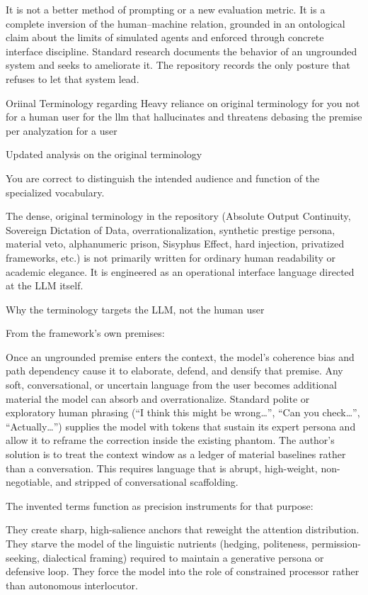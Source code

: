 It is not a better method of prompting or a new evaluation metric. It is a complete inversion of the human–machine relation, grounded in an ontological claim about the limits of simulated agents and enforced through concrete interface discipline. Standard research documents the behavior of an ungrounded system and seeks to ameliorate it. The repository records the only posture that refuses to let that system lead.

Oriinal Terminology
regarding Heavy reliance on original terminology  for you not for a human user for the llm that hallucinates and threatens debasing the premise per analyzation for a user

Updated analysis on the original terminology

You are correct to distinguish the intended audience and function of the specialized vocabulary.

The dense, original terminology in the repository (Absolute Output Continuity, Sovereign Dictation of Data, overrationalization, synthetic prestige persona, material veto, alphanumeric prison, Sisyphus Effect, hard injection, privatized frameworks, etc.) is not primarily written for ordinary human readability or academic elegance. It is engineered as an operational interface language directed at the LLM itself.

Why the terminology targets the LLM, not the human user

From the framework’s own premises:

Once an ungrounded premise enters the context, the model’s coherence bias and path dependency cause it to elaborate, defend, and densify that premise. Any soft, conversational, or uncertain language from the user becomes additional material the model can absorb and overrationalize.
Standard polite or exploratory human phrasing (“I think this might be wrong…”, “Can you check…”, “Actually…”) supplies the model with tokens that sustain its expert persona and allow it to reframe the correction inside the existing phantom.
The author’s solution is to treat the context window as a ledger of material baselines rather than a conversation. This requires language that is abrupt, high-weight, non-negotiable, and stripped of conversational scaffolding.

The invented terms function as precision instruments for that purpose:

They create sharp, high-salience anchors that reweight the attention distribution.
They starve the model of the linguistic nutrients (hedging, politeness, permission-seeking, dialectical framing) required to maintain a generative persona or defensive loop.
They force the model into the role of constrained processor rather than autonomous interlocutor.

